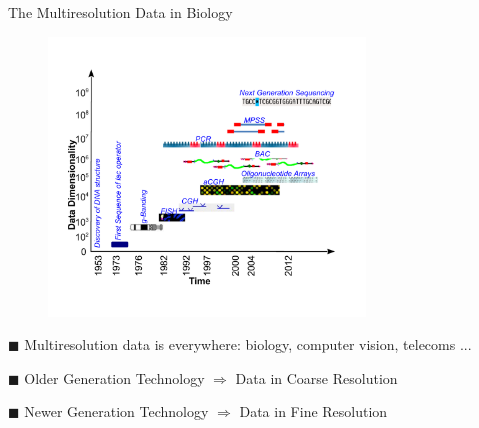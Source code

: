\documentclass[first=dgreen,second=purple,logo=redexc]{aaltoslides}
\begin{document}
\begin{frame} {The Multiresolution Data in Biology} 

\vspace{1mm}

\begin{figure}
\centering
  \includegraphics[trim=1cm 2cm 0.5cm 2.2cm, clip=true, width=0.75\textwidth]{figures/arraytypes}
\end{figure}

\vspace{-3mm}

\footnotesize
$\blacksquare$ Multiresolution data is everywhere: biology, computer vision, telecoms ...

$\blacksquare$ Older Generation Technology $\Rightarrow$ Data in Coarse Resolution

$\blacksquare$ Newer Generation Technology $\Rightarrow$ Data in Fine Resolution


\end{frame}

\end{document}
